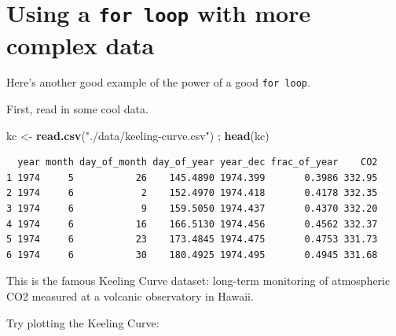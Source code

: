 \documentclass[
]{book}
\newenvironment{Shaded}{\begin{snugshade}}{\end{snugshade}}
\newcommand{\DataTypeTok}[1]{\textcolor[rgb]{0.13,0.29,0.53}{#1}}
\newcommand{\KeywordTok}[1]{\textcolor[rgb]{0.13,0.29,0.53}{\textbf{#1}}}
\newcommand{\NormalTok}[1]{#1}
\newcommand{\OperatorTok}[1]{\textcolor[rgb]{0.81,0.36,0.00}{\textbf{#1}}}
\newcommand{\StringTok}[1]{\textcolor[rgb]{0.31,0.60,0.02}{#1}}
\begin{document}
\hypertarget{using-a-for-loop-with-more-complex-data}{%
\section*{\texorpdfstring{Using a \texttt{for\ loop} with more complex data}{Using a for loop with more complex data}}\label{using-a-for-loop-with-more-complex-data}}

Here's another good example of the power of a good \texttt{for\ loop}.

First, read in some cool data.

\begin{Shaded}
\begin{Highlighting}[]
\NormalTok{kc <-}\StringTok{ }\KeywordTok{read.csv}\NormalTok{(}\StringTok{"./data/keeling-curve.csv"}\NormalTok{) ; }\KeywordTok{head}\NormalTok{(kc)}
\end{Highlighting}
\end{Shaded}

\begin{verbatim}
  year month day_of_month day_of_year year_dec frac_of_year    CO2
1 1974     5           26    145.4890 1974.399       0.3986 332.95
2 1974     6            2    152.4970 1974.418       0.4178 332.35
3 1974     6            9    159.5050 1974.437       0.4370 332.20
4 1974     6           16    166.5130 1974.456       0.4562 332.37
5 1974     6           23    173.4845 1974.475       0.4753 331.73
6 1974     6           30    180.4925 1974.495       0.4945 331.68
\end{verbatim}

This is the famous Keeling Curve dataset: long-term monitoring of atmospheric CO2 measured at a volcanic observatory in Hawaii.

Try plotting the Keeling Curve:

\begin{Shaded}
\end{Shaded}
\end{document}
